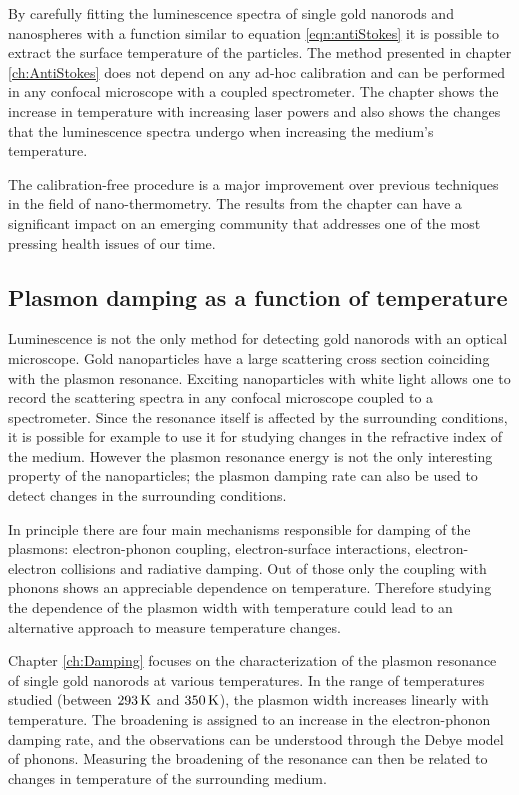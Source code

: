 By carefully fitting the luminescence spectra of single gold nanorods and
nanospheres with a function similar to equation \ref{eqn:antiStokes} it is
possible to extract the surface temperature of the particles. The method
presented in chapter \ref{ch:AntiStokes} does not depend on any ad-hoc
calibration and can be performed in any confocal microscope with a coupled
spectrometer. The chapter shows the increase in temperature with increasing
laser powers and also shows the changes that the luminescence spectra undergo
when increasing the medium's temperature.

The calibration-free procedure is a major improvement over previous techniques
in the field of nano-thermometry. The results from the chapter can have a
significant impact on an emerging community that addresses one of the most
pressing health issues of our time.

\subsection{Plasmon damping as a function of temperature}
Luminescence is not the only method for detecting gold nanorods with an optical
microscope. Gold nanoparticles have a large scattering cross section coinciding
with the plasmon resonance. Exciting nanoparticles with white light allows one
to record the scattering spectra in any confocal microscope coupled to a
spectrometer. Since the resonance itself is affected by the surrounding
conditions\cite{Liu2009b,Konrad2013}, it is possible for example to use it for
studying changes in the refractive index of the medium. However the plasmon
resonance energy is not the only interesting property of the nanoparticles; the
plasmon damping rate can also be used to detect changes in the surrounding
conditions.

\begin{sloppypar}
In principle there are four main mechanisms responsible for damping of the
plasmons\cite{Sonnichsen2002,Novo2006,Hu2008}: electron-phonon coupling,
electron-surface interactions, electron-electron collisions and radiative
damping. Out of those only the coupling with phonons shows an appreciable
dependence on temperature\cite{Liu2009b,Konrad2013}. Therefore studying the
dependence of the plasmon width with temperature could lead to an alternative
approach to measure temperature changes.
\end{sloppypar}

Chapter \ref{ch:Damping} focuses on the characterization of the plasmon
resonance of single gold nanorods at various temperatures. In the range of
temperatures studied (between $293\,\textrm{K}$ and $350\,\textrm{K}$), the plasmon width increases
linearly with temperature. The broadening is assigned to an increase in the
electron-phonon damping rate, and the observations can be understood through the
Debye model of phonons. Measuring the broadening of the resonance can then be
related to changes in temperature of the surrounding medium.

